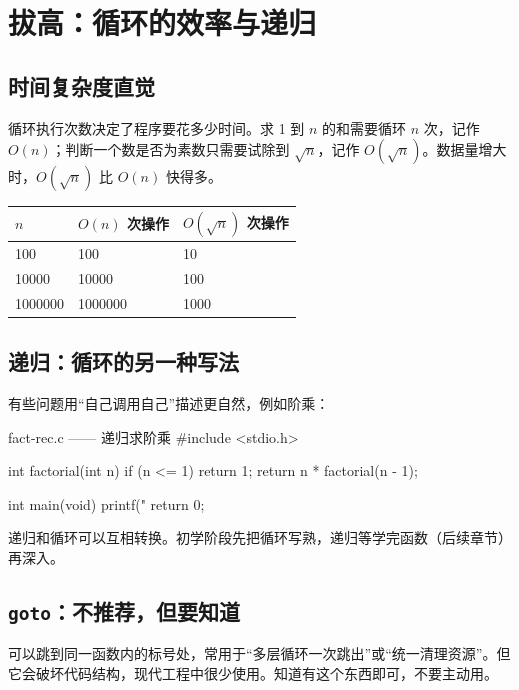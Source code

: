 \section{拔高：循环的效率与递归}

\subsection{时间复杂度直觉}

循环执行次数决定了程序要花多少时间。求 1 到 $n$ 的和需要循环 $n$ 次，记作 $O(n)$；判断一个数是否为素数只需要试除到 $\sqrt{n}$，记作 $O(\sqrt{n})$。数据量增大时，$O(\sqrt{n})$ 比 $O(n)$ 快得多。

\begin{center}
\begin{tabular}{@{}lll@{}}
\toprule
$n$ & $O(n)$ 次操作 & $O(\sqrt{n})$ 次操作 \\
\midrule
100 & 100 & 10 \\
10000 & 10000 & 100 \\
1000000 & 1000000 & 1000 \\
\bottomrule
\end{tabular}
\end{center}

\subsection{递归：循环的另一种写法}

有些问题用“自己调用自己”描述更自然，例如阶乘：

\begin{codebox}{fact-rec.c —— 递归求阶乘}
#include <stdio.h>

int factorial(int n)
{
    if (n <= 1) {
        return 1;
    }
    return n * factorial(n - 1);
}

int main(void)
{
    printf("%
    return 0;
}
\end{codebox}

递归和循环可以互相转换。初学阶段先把循环写熟，递归等学完函数（后续章节）再深入。

\subsection{\texttt{goto}：不推荐，但要知道}

 可以跳到同一函数内的标号处，常用于“多层循环一次跳出”或“统一清理资源”。但它会破坏代码结构，现代工程中很少使用。知道有这个东西即可，不要主动用。

